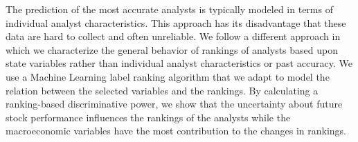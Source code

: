 The prediction of the most accurate analysts is typically modeled in terms of individual analyst characteristics. This approach has its disadvantage that these data are hard to collect and often unreliable. We follow a different approach in which we characterize the general behavior of rankings of analysts based upon state variables rather than individual analyst characteristics or past accuracy. We use a Machine Learning label ranking algorithm that we adapt to model the relation between the selected variables and the rankings. By calculating a ranking-based discriminative power, we show that the uncertainty about future stock performance influences the rankings of the analysts while the macroeconomic variables have the most contribution to the changes in rankings.
